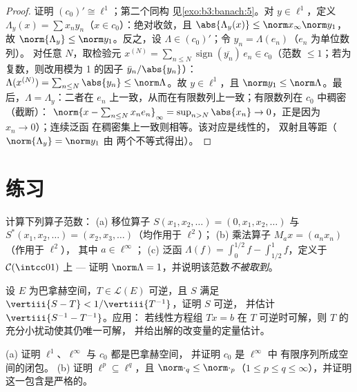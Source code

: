 \begin{proof}
证明 $(c_0)' \cong \ell^1$；第二个同构
见\cref{exo:b3:banach:5}。对 $y \in \ell^1$，定义 $\Lambda_y(x)
= \sum x_ny_n$（$x \in c_0$）：绝对收敛，且
$\abs{\Lambda_y(x)} \leq \norm x_\infty\norm y_1$，故
$\norm{\Lambda_y} \leq \norm y_1$。反之，设 $\Lambda \in
(c_0)'$；令 $y_n = \Lambda(e_n)$（$e_n$ 为单位数列）。
对任意 $N$，取检验元 $x^{(N)} = \sum_{n \leq N}
\operatorname{sign}(\overline{y_n})\,e_n \in c_0$（范数 $\leq
1$；若为复数，则改用模为 1 的因子 $\bar y_n/\abs
{y_n}$）：$\Lambda(x^{(N)}) = \sum_{n\leq N}\abs{y_n} \leq
\norm\Lambda$。故 $y \in \ell^1$，且 $\norm y_1 \leq
\norm\Lambda$。最后，$\Lambda = \Lambda_y$：二者在
$e_n$ 上一致，从而在有限数列上一致；有限数列在 $c_0$ 中稠密（截断）：
$\norm{x - \sum_{n \leq N}x_ne_n}_\infty = \sup_{n > N}\abs{x_n}
\to 0$，正是因为 $x_n \to 0$）；连续泛函
在稠密集上一致则相等。该对应是线性的，
双射且等距（$\norm{\Lambda_y} = \norm y_1$ 由
两个不等式得出）。
\end{proof}

\section{练习}

\begin{exercise}[$\star$]\label{exo:b3:banach:1}
计算下列算子范数：
(a) 移位算子 $S(x_1, x_2, \dots) = (0, x_1, x_2, \dots)$ 与
$S^*(x_1, x_2, \dots) = (x_2, x_3, \dots)$（均作用于 $\ell^2$）；
(b) 乘法算子 $M_a x = (a_nx_n)$（作用于 $\ell^2$），
其中 $a \in \ell^\infty$；
(c) 泛函 $\Lambda(f) = \int_0^{1/2}f -
\int_{1/2}^1f$，定义于 $\mathcal C(\intcc01)$ 上 --- 证明
$\norm\Lambda = 1$，并说明该范数\emph{不被取到}。
\end{exercise}

\begin{exercise}[$\star$]\label{exo:b3:banach:2}
设 $E$ 为巴拿赫空间，$T \in \mathcal L(E)$ 可逆，且 $S$
满足 $\vertiii{S - T} < 1/\vertiii{T^{-1}}$，证明 $S$ 可逆，
并估计 $\vertiii{S^{-1} - T^{-1}}$。应用：
若线性方程组 $Tx = b$ 在 $T$ 可逆时可解，则
$T$ 的充分小扰动使其仍唯一可解，
并给出解的改变量的定量估计。
\end{exercise}

\begin{exercise}[$\star\star$]\label{exo:b3:banach:3}
(a) 证明 $\ell^1$、$\ell^\infty$ 与 $c_0$ 都是巴拿赫空间，
并证明 $c_0$ 是 $\ell^\infty$ 中
有限序列所成空间的闭包。
(b) 证明 $\ell^p \subseteq \ell^q$，且 $\norm\cdot_q \leq
\norm\cdot_p$（$1 \leq p \leq q \leq \infty$），并证明
这一包含是严格的。
\end{exercise}

